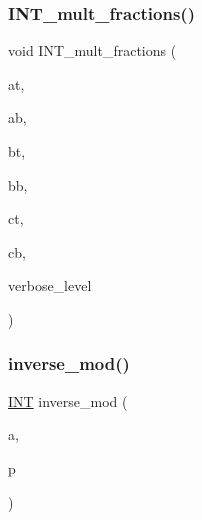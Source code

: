\subsubsection{\texorpdfstring{I\+N\+T\+\_\+mult\+\_\+fractions()}{INT\_mult\_fractions()}}
{\footnotesize\ttfamily void I\+N\+T\+\_\+mult\+\_\+fractions (\begin{DoxyParamCaption}\item[{\mbox{\hyperlink{galois_8h_a09fddde158a3a20bd2dcadb609de11dc}{I\+NT}}}]{at,  }\item[{\mbox{\hyperlink{galois_8h_a09fddde158a3a20bd2dcadb609de11dc}{I\+NT}}}]{ab,  }\item[{\mbox{\hyperlink{galois_8h_a09fddde158a3a20bd2dcadb609de11dc}{I\+NT}}}]{bt,  }\item[{\mbox{\hyperlink{galois_8h_a09fddde158a3a20bd2dcadb609de11dc}{I\+NT}}}]{bb,  }\item[{\mbox{\hyperlink{galois_8h_a09fddde158a3a20bd2dcadb609de11dc}{I\+NT}} \&}]{ct,  }\item[{\mbox{\hyperlink{galois_8h_a09fddde158a3a20bd2dcadb609de11dc}{I\+NT}} \&}]{cb,  }\item[{\mbox{\hyperlink{galois_8h_a09fddde158a3a20bd2dcadb609de11dc}{I\+NT}}}]{verbose\+\_\+level }\end{DoxyParamCaption})}

\mbox{\label{number__theory_8_c_acf368cfa9638bcf69f2ced357a6d2250}} 
\subsubsection{\texorpdfstring{inverse\+\_\+mod()}{inverse\_mod()}}
{\footnotesize\ttfamily \mbox{\hyperlink{galois_8h_a09fddde158a3a20bd2dcadb609de11dc}{I\+NT}} inverse\+\_\+mod (\begin{DoxyParamCaption}\item[{\mbox{\hyperlink{galois_8h_a09fddde158a3a20bd2dcadb609de11dc}{I\+NT}}}]{a,  }\item[{\mbox{\hyperlink{galois_8h_a09fddde158a3a20bd2dcadb609de11dc}{I\+NT}}}]{p }\end{DoxyParamCaption})}

\mbox{\label{number__theory_8_c_ae753505dbf1e3a9adaaf2f0893dd8c6c}} 
